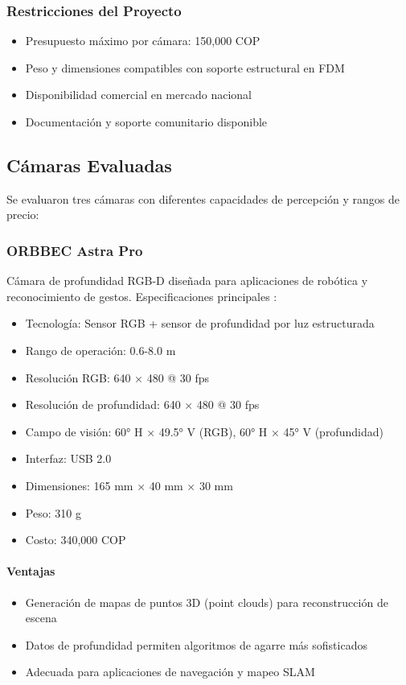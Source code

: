 \subsubsection{Restricciones del Proyecto}

\begin{itemize}
    \item Presupuesto máximo por cámara: 150,000 COP
    \item Peso y dimensiones compatibles con soporte estructural en FDM
    \item Disponibilidad comercial en mercado nacional
    \item Documentación y soporte comunitario disponible
\end{itemize}

\subsection{Cámaras Evaluadas}

Se evaluaron tres cámaras con diferentes capacidades de percepción y rangos de precio:

\subsubsection{ORBBEC Astra Pro}

Cámara de profundidad RGB-D diseñada para aplicaciones de robótica y reconocimiento de gestos. Especificaciones principales \cite{Orbbec2024AstraPro}:

\begin{itemize}
    \item Tecnología: Sensor RGB + sensor de profundidad por luz estructurada
    \item Rango de operación: 0.6-8.0 m
    \item Resolución RGB: 640 × 480 @ 30 fps
    \item Resolución de profundidad: 640 × 480 @ 30 fps
    \item Campo de visión: 60° H × 49.5° V (RGB), 60° H × 45° V (profundidad)
    \item Interfaz: USB 2.0
    \item Dimensiones: 165 mm × 40 mm × 30 mm
    \item Peso: 310 g
    \item Costo: 340,000 COP
\end{itemize}

\paragraph{Ventajas}
\begin{itemize}
    \item Generación de mapas de puntos 3D (point clouds) para reconstrucción de escena
    \item Datos de profundidad permiten algoritmos de agarre más sofisticados
    \item Adecuada para aplicaciones de navegación y mapeo SLAM
\end{itemize}

